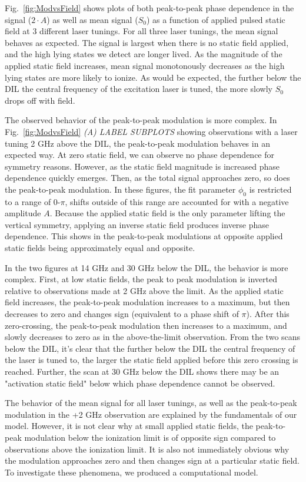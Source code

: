 \documentclass[aps,pra,preprint,groupedaddress]{revtex4-1}
\begin{document}
Fig.~\ref{fig:ModvsField} shows plots of both peak-to-peak phase dependence in the signal ($2\cdot A$) as well as mean signal ($S_0$) as a function of applied pulsed static field at 3 different laser tunings. For all three laser tunings, the mean signal behaves as expected. The signal is largest when there is no static field applied, and the high lying states we detect are longer lived. As the magnitude of the applied static field increases, mean signal monotonously decreases as the high lying states are more likely to ionize. As would be expected, the further below the DIL the central frequency of the excitation laser is tuned, the more slowly $S_0$ drops off with field.

The observed behavior of the peak-to-peak modulation is more complex. In Fig.~\ref{fig:ModvsField} \emph{(A) LABEL SUBPLOTS} showing observations with a laser tuning 2 GHz above the DIL, the peak-to-peak modulation behaves in an expected way. At zero static field, we can observe no phase dependence for symmetry reasons. However, as the static field magnitude is increased phase dependence quickly emerges. Then, as the total signal approaches zero, so does the peak-to-peak modulation. In these figures, the fit parameter $\phi_0$ is restricted to a range of 0-$\pi$, shifts outside of this range are accounted for with a negative amplitude $A$. Because the applied static field is the only parameter lifting the vertical symmetry, applying an inverse static field produces inverse phase dependence. This shows in the peak-to-peak modulations at opposite applied static fields being approximately equal and opposite.

In the two figures at 14 GHz and 30 GHz below the DIL, the behavior is more complex. First, at low static fields, the peak to peak modulation is inverted relative to observations made at 2 GHz above the limit. As the applied static field increases, the peak-to-peak modulation increases to a maximum, but then decreases to zero and changes sign (equivalent to a phase shift of $\pi$). After this zero-crossing, the peak-to-peak modulation then increases to a maximum, and slowly decreases to zero as in the above-the-limit observation. From the two scans below the DIL, it's clear that the further below the DIL the central frequency of the laser is tuned to, the larger the static field applied before this zero crossing is reached. Further, the scan at 30 GHz below the DIL shows there may be an "activation static field" below which phase dependence cannot be observed.

The behavior of the mean signal for all laser tunings, as well as the peak-to-peak modulation in the +2 GHz observation are explained by the fundamentals of our model. However, it is not clear why at small applied static fields, the peak-to-peak modulation below the ionization limit is of opposite sign compared to observations above the ionization limit. It is also not immediately obvious why the modulation approaches zero and then changes sign at a particular static field. To investigate these phenomena, we produced a computational model.
\end{document}
